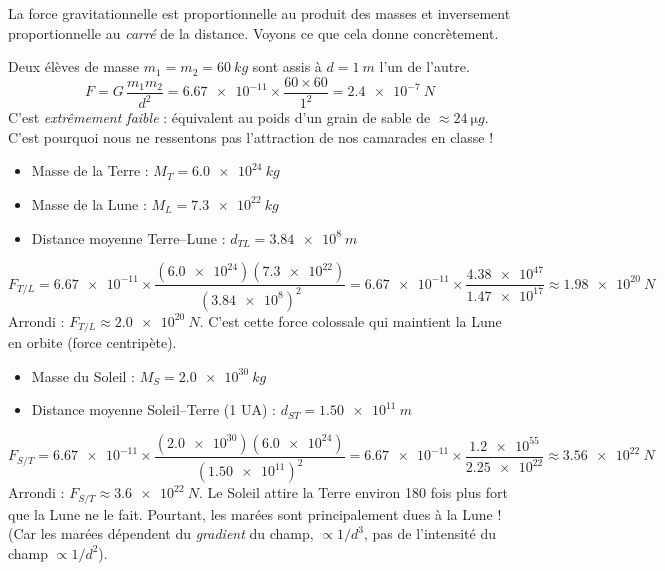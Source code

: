 \documentclass[11pt]{article}
\begin{document}
La force gravitationnelle est proportionnelle au produit des masses et inversement proportionnelle au \emph{carré} de la distance. Voyons ce que cela donne concrètement.

\begin{exemplebox}
Deux élèves de masse $m_1 = m_2 = \SI{60}{kg}$ sont assis à $d = \SI{1}{m}$ l'un de l'autre.
\[
F = G\,\frac{m_1 m_2}{d^2} = \num{6,67e-11} \times \frac{60 \times 60}{1^2} = \SI{2,4e-7}{N}
\]
C'est \emph{extrêmement faible} : équivalent au poids d'un grain de sable de $\approx \SI{24}{\micro g}$. C'est pourquoi nous ne ressentons pas l'attraction de nos camarades en classe !
\end{exemplebox}

\begin{exemplebox}
\begin{itemize}
    \item Masse de la Terre : $M_T = \SI{6,0e24}{kg}$
    \item Masse de la Lune : $M_L = \SI{7,3e22}{kg}$
    \item Distance moyenne Terre–Lune : $d_{TL} = \SI{3,84e8}{m}$
\end{itemize}
\[
F_{T/L} = \num{6,67e-11} \times \frac{(\num{6,0e24})(\num{7,3e22})}{(\num{3,84e8})^2}
= \num{6,67e-11} \times \frac{\num{4,38e47}}{\num{1,47e17}}
\approx \SI{1,98e20}{N}
\]
Arrondi : $\boxed{F_{T/L} \approx \SI{2,0e20}{N}}$.
C'est cette force colossale qui maintient la Lune en orbite (force centripète).
\end{exemplebox}

\begin{exemplebox}
\begin{itemize}
    \item Masse du Soleil : $M_S = \SI{2,0e30}{kg}$
    \item Distance moyenne Soleil–Terre (1 UA) : $d_{ST} = \SI{1,50e11}{m}$
\end{itemize}
\[
F_{S/T} = \num{6,67e-11} \times \frac{(\num{2,0e30})(\num{6,0e24})}{(\num{1,50e11})^2}
= \num{6,67e-11} \times \frac{\num{1,2e55}}{\num{2,25e22}}
\approx \SI{3,56e22}{N}
\]
Arrondi : $\boxed{F_{S/T} \approx \SI{3,6e22}{N}}$.
Le Soleil attire la Terre environ 180 fois plus fort que la Lune ne le fait. Pourtant, les marées sont principalement dues à la Lune ! (Car les marées dépendent du \emph{gradient} du champ, $\propto 1/d^3$, pas de l'intensité du champ $\propto 1/d^2$).
\end{exemplebox}
\end{document}
